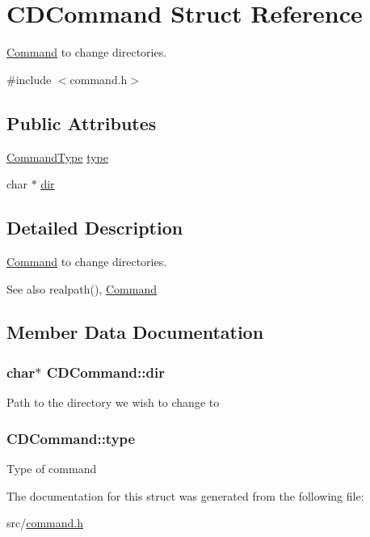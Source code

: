 \hypertarget{structCDCommand}{}\section{C\+D\+Command Struct Reference}
\label{structCDCommand}


\hyperlink{unionCommand}{Command} to change directories.  




{\ttfamily \#include $<$command.\+h$>$}

\subsection*{Public Attributes}
\begin{DoxyCompactItemize}
\item 
\hyperlink{command_8h_a21e038f5b8958e203d28bc4f18472352}{Command\+Type} \hyperlink{structCDCommand_a8e57e7a2c0aa827e7f211cd0b99483f6}{type}
\item 
char $\ast$ \hyperlink{structCDCommand_a3696e9b5a96ed447056a4753906277d1}{dir}
\end{DoxyCompactItemize}


\subsection{Detailed Description}
\hyperlink{unionCommand}{Command} to change directories. 

\begin{DoxySeeAlso}{See also}
realpath(), \hyperlink{unionCommand}{Command} 
\end{DoxySeeAlso}


\subsection{Member Data Documentation}
\subsubsection[{\texorpdfstring{dir}{dir}}]{\setlength{\rightskip}{0pt plus 5cm}char$\ast$ C\+D\+Command\+::dir}\hypertarget{structCDCommand_a3696e9b5a96ed447056a4753906277d1}{}\label{structCDCommand_a3696e9b5a96ed447056a4753906277d1}
Path to the directory we wish to change to 
\subsubsection[{\texorpdfstring{type}{type}}]{ C\+D\+Command\+::type}\hypertarget{structCDCommand_a8e57e7a2c0aa827e7f211cd0b99483f6}{}\label{structCDCommand_a8e57e7a2c0aa827e7f211cd0b99483f6}
Type of command 

The documentation for this struct was generated from the following file\+:\begin{DoxyCompactItemize}
\item 
src/\hyperlink{command_8h}{command.\+h}\end{DoxyCompactItemize}
